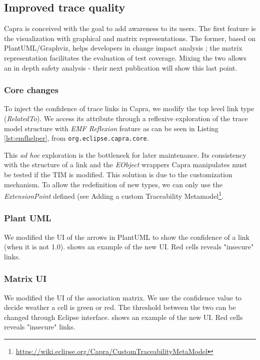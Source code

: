 \subsection{Improved trace quality}
Capra is conceived with the goal to add awareness to its users. The first feature is the visualization with graphical and matrix representations. The former, based on PlantUML/Graphviz, helps developers in change impact analysis ; the matrix representation facilitates the evaluation of test coverage. Mixing the two allows an in depth safety analysis - their next publication will show this last point.

\subsubsection{Core changes}
To inject the confidence of trace links in Capra, we modify the top level link type (\textit{RelatedTo}). We access its attribute through a reflexive exploration of the trace model structure with \textit{EMF Reflexion} feature as can be seen in Listing \ref{lst:emfhelper}, from \verb|org.eclipse.capra.core|. 



This \textit{ad hoc} exploration is the bottleneck for later maintenance. Its consistency with the structure of a link and the \textit{EObject} wrappers Capra manipulates must be tested if the TIM is modified. 
This solution is due to the customization mechanism. To allow the redefinition of new types, we can only use the \textit{ExtensionPoint} defined (see Adding a custom Traceability Metamodel\footnote{\url{https://wiki.eclipse.org/Capra/CustomTraceabilityMetaModel}}.


\subsubsection{Plant UML}
We modified the UI of the arrows in PlantUML to show the confidence of a link (when it is not 1.0).   shows an example of the new UI. Red cells reveals "insecure" links.

\subsubsection{Matrix UI}
We modified the UI of the association matrix. We use the confidence value to decide weather a cell is green or red. The threshold between the two can be changed through Eclipse interface.  shows an example of the new UI. Red cells reveals "insecure" links.

